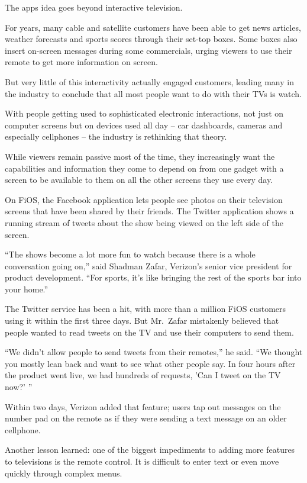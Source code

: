 ﻿\documentclass[12pt]{article}
\begin{document}
The apps idea goes beyond interactive television.

For years, many cable and satellite customers have been able to get news articles, weather forecasts
and sports scores through their set-top boxes. Some boxes also insert on-screen messages during some
commercials, urging viewers to use their remote to get more information on screen.

But very little of this interactivity actually engaged customers, leading many in the industry to
conclude that all most people want to do with their TVs is watch.

With people getting used to sophisticated electronic interactions, not just on computer screens but
on devices used all day -- car dashboards, cameras and especially cellphones -- the industry is
rethinking that theory.

While viewers remain passive most of the time, they increasingly want the capabilities and
information they come to depend on from one gadget with a screen to be available to them on all the
other screens they use every day.

On FiOS, the Facebook application lets people see photos on their television screens that have been
shared by their friends. The Twitter application shows a running stream of tweets about the show
being viewed on the left side of the screen.

``The shows become a lot more fun to watch because there is a whole conversation going on,'' said
Shadman Zafar, Verizon's senior vice president for product development. ``For sports, it's like
bringing the rest of the sports bar into your home.''

The Twitter service has been a hit, with more than a million FiOS customers using it within the
first three days. But Mr.~Zafar mistakenly believed that people wanted to read tweets on the TV and
use their computers to send them.

``We didn't allow people to send tweets from their remotes,'' he said. ``We thought you mostly lean
back and want to see what other people say. In four hours after the product went live, we had
hundreds of requests, 'Can I tweet on the TV now?' ''

Within two days, Verizon added that feature; users tap out messages on the number pad on the remote
as if they were sending a text message on an older cellphone.

Another lesson learned: one of the biggest impediments to adding more features to televisions is the
remote control. It is difficult to enter text or even move quickly through complex menus.
\end{document}
